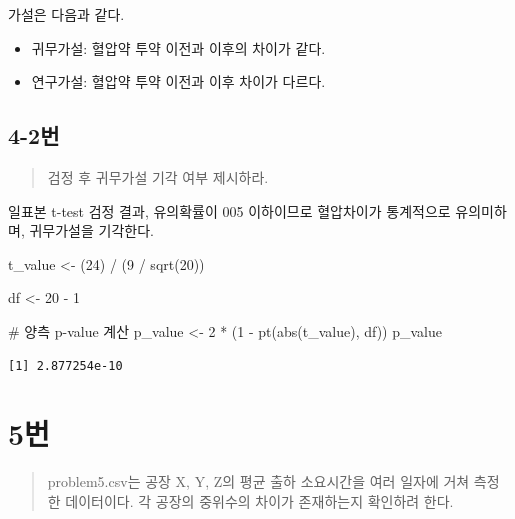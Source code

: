 \documentclass[
  letterpaper,
  DIV=11,
  numbers=noendperiod]{scrreprt}
\newenvironment{Shaded}{\begin{snugshade}}{\end{snugshade}}
\newcommand{\CommentTok}[1]{\textcolor[rgb]{0.37,0.37,0.37}{#1}}
\newcommand{\DecValTok}[1]{\textcolor[rgb]{0.68,0.00,0.00}{#1}}
\newcommand{\FunctionTok}[1]{\textcolor[rgb]{0.28,0.35,0.67}{#1}}
\newcommand{\NormalTok}[1]{\textcolor[rgb]{0.00,0.23,0.31}{#1}}
\newcommand{\OtherTok}[1]{\textcolor[rgb]{0.00,0.23,0.31}{#1}}
\newcommand{\SpecialCharTok}[1]{\textcolor[rgb]{0.37,0.37,0.37}{#1}}
\providecommand{\tightlist}{%
  \setlength{\itemsep}{0pt}\setlength{\parskip}{0pt}}\usepackage{longtable,booktabs,array}
\begin{document}
가설은 다음과 같다.

\begin{itemize}
\tightlist
\item
  귀무가설: 혈압약 투약 이전과 이후의 차이가 같다.
\item
  연구가설: 혈압약 투약 이전과 이후 차이가 다르다.
\end{itemize}

\hypertarget{uxbc88-55}{%
\section*{4-2번}\label{uxbc88-55}}


\begin{quote}
검정 후 귀무가설 기각 여부 제시하라.
\end{quote}

일표본 t-test 검정 결과, 유의확률이 005 이하이므로 혈압차이가 통계적으로
유의미하며, 귀무가설을 기각한다.

\begin{Shaded}
\begin{Highlighting}[]
\NormalTok{t\_value }\OtherTok{\textless{}{-}}\NormalTok{ (}\DecValTok{24}\NormalTok{) }\SpecialCharTok{/}\NormalTok{ (}\DecValTok{9} \SpecialCharTok{/} \FunctionTok{sqrt}\NormalTok{(}\DecValTok{20}\NormalTok{))}

\NormalTok{df }\OtherTok{\textless{}{-}} \DecValTok{20} \SpecialCharTok{{-}} \DecValTok{1}

\CommentTok{\# 양측 p{-}value 계산}
\NormalTok{p\_value }\OtherTok{\textless{}{-}} \DecValTok{2} \SpecialCharTok{*}\NormalTok{ (}\DecValTok{1} \SpecialCharTok{{-}} \FunctionTok{pt}\NormalTok{(}\FunctionTok{abs}\NormalTok{(t\_value), df))}
\NormalTok{p\_value}
\end{Highlighting}
\end{Shaded}

\begin{verbatim}
[1] 2.877254e-10
\end{verbatim}

\hypertarget{uxbc88-56}{%
\chapter*{5번}\label{uxbc88-56}}


\begin{quote}
problem5.csv는 공장 X, Y, Z의 평균 출하 소요시간을 여러 일자에 거쳐
측정한 데이터이다. 각 공장의 중위수의 차이가 존재하는지 확인하려 한다.
\end{quote}
\end{document}
